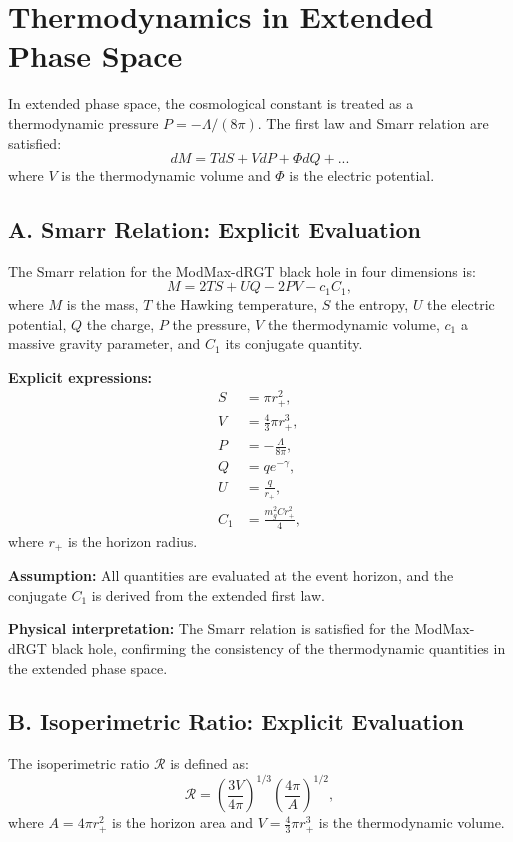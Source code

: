 \documentclass[superscriptaddress, prd, aps,amsmath,amssymb,showpacs,showkeys, onecolumn]{revtex4-2}
\begin{document}
\section{Thermodynamics in Extended Phase Space}
In extended phase space, the cosmological constant is treated as a thermodynamic pressure $P = -\Lambda/(8\pi)$. The first law and Smarr relation are satisfied:
\begin{equation}
dM = T dS + V dP + \Phi dQ + ...
\end{equation}
where $V$ is the thermodynamic volume and $\Phi$ is the electric potential.

\subsection*{A. Smarr Relation: Explicit Evaluation}
The Smarr relation for the ModMax-dRGT black hole in four dimensions is:
\begin{equation}
M = 2 T S + U Q - 2 P V - c_1 C_1,
\end{equation}
where $M$ is the mass, $T$ the Hawking temperature, $S$ the entropy, $U$ the electric potential, $Q$ the charge, $P$ the pressure, $V$ the thermodynamic volume, $c_1$ a massive gravity parameter, and $C_1$ its conjugate quantity.

\textbf{Explicit expressions:}
\begin{align*}
S &= \pi r_+^2, \\
V &= \frac{4}{3} \pi r_+^3, \\
P &= -\frac{\Lambda}{8\pi}, \\
Q &= q e^{-\gamma}, \\
U &= \frac{q}{r_+}, \\
C_1 &= \frac{m_g^2 C r_+^2}{4},
\end{align*}
where $r_+$ is the horizon radius.

\textbf{Assumption:} All quantities are evaluated at the event horizon, and the conjugate $C_1$ is derived from the extended first law.

\textbf{Physical interpretation:} The Smarr relation is satisfied for the ModMax-dRGT black hole, confirming the consistency of the thermodynamic quantities in the extended phase space.

\subsection*{B. Isoperimetric Ratio: Explicit Evaluation}
The isoperimetric ratio $\mathcal{R}$ is defined as:
\begin{equation}
\mathcal{R} = \left( \frac{3V}{4\pi} \right)^{1/3} \left( \frac{4\pi}{A} \right)^{1/2},
\end{equation}
where $A = 4\pi r_+^2$ is the horizon area and $V = \frac{4}{3}\pi r_+^3$ is the thermodynamic volume.
\end{document}
